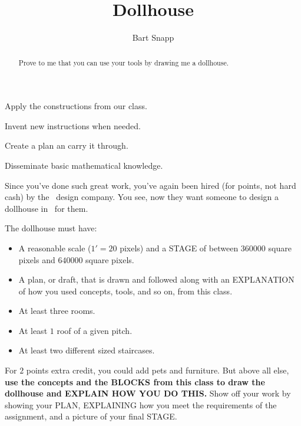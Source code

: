 \documentclass[noauthor,nooutcomes,12pt,hints]{ximera}
\title{Dollhouse}
\author{Bart Snapp}
\begin{document}
\begin{abstract}
  Prove to me that you can use your tools by drawing me a dollhouse.
\end{abstract}
\maketitle

\begin{listOutcomes}
\item Apply the constructions from our class.
\item Invent new instructions when needed.
\item Create a plan an carry it through.
\item Disseminate basic mathematical knowledge.
\end{listOutcomes}

Since you've done such great work, you've again been hired (for
points, not hard cash) by the \mooculus\ design company. You see,
now they want someone to design a dollhouse in \snap\ for them.

The dollhouse must have:
\begin{itemize}
\item A reasonable scale ($1'=20$ pixels) and a STAGE of between $360000$
  square pixels and $640000$ square pixels.
\item A plan, or draft, that is drawn and followed along with an
  EXPLANATION of how you used concepts, tools, and so on, from this
  class.
\item At least three rooms. 
\item At least $1$ roof of a given pitch.
\item At least two different sized staircases.
\end{itemize}
For $2$ points extra credit, you could add pets and furniture. But
above all else, \textbf{use the concepts and the BLOCKS from this
  class to draw the dollhouse and EXPLAIN HOW YOU DO THIS.} Show off
your work by showing your PLAN, EXPLAINING how you meet the
requirements of the assignment, and a picture of your final STAGE.
\end{document}
